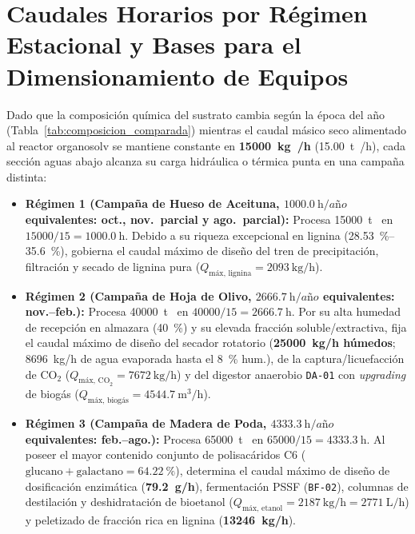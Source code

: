 \documentclass{report}
\begin{document}
\section{Caudales Horarios por Régimen Estacional y Bases para el Dimensionamiento de Equipos}
Dado que la composición química del sustrato cambia según la época del año (Tabla~\ref{tab:composicion_comparada}) mientras el caudal másico seco alimentado al reactor organosolv se mantiene constante en \textbf{\SI{15000}{\kilo\gram{}/\hour}} (\SI{15.00}{\tonne{}/\hour}), cada sección aguas abajo alcanza su carga hidráulica o térmica punta en una campaña distinta:
\begin{itemize}
    \item \textbf{Régimen 1 (Campaña de Hueso de Aceituna, $\SI{1000.0}{\hour/a\text{\~{n}}o}$ equivalentes: oct., nov.\ parcial y ago.\ parcial):} Procesa \SI{15000}{\tonne{}} en $\num{15000} / 15 = \SI{1000.0}{\hour}$. Debido a su riqueza excepcional en lignina (\SI{28.53}{\percent}--\SI{35.6}{\percent}), gobierna el caudal máximo de diseño del tren de precipitación, filtración y secado de lignina pura (\textbf{$Q_{\text{máx, lignina}} = \SI{2093}{\kilo\gram/\hour}$}).
    \item \textbf{Régimen 2 (Campaña de Hoja de Olivo, $\SI{2666.7}{\hour/a\text{\~{n}}o}$ equivalentes: nov.--feb.):} Procesa \SI{40000}{\tonne{}} en $\num{40000} / 15 = \SI{2666.7}{\hour}$. Por su alta humedad de recepción en almazara (\SI{40}{\percent}) y su elevada fracción soluble/extractiva, fija el caudal máximo de diseño del secador rotatorio (\textbf{\SI{25000}{\kilo\gram/\hour} húmedos}; \SI{8696}{\kilo\gram/\hour} de agua evaporada hasta el \SI{8}{\percent} hum.), de la captura/licuefacción de $\text{CO}_2$ (\textbf{$Q_{\text{máx, CO}_2} = \SI{7672}{\kilo\gram/\hour}$}) y del digestor anaerobio \texttt{DA-01} con \textit{upgrading} de biogás (\textbf{$Q_{\text{máx, biogás}} = \SI{4544.7}{\cubic\meter/\hour}$}).
    \item \textbf{Régimen 3 (Campaña de Madera de Poda, $\SI{4333.3}{\hour/a\text{\~{n}}o}$ equivalentes: feb.--ago.):} Procesa \SI{65000}{\tonne{}} en $\num{65000} / 15 = \SI{4333.3}{\hour}$. Al poseer el mayor contenido conjunto de polisacáridos C6 ($\text{glucano} + \text{galactano} = \SI{64.22}{\percent}$), determina el caudal máximo de diseño de dosificación enzimática (\textbf{\SI{79.2}{\gram/\hour}}), fermentación PSSF (\texttt{BF-02}), columnas de destilación y deshidratación de bioetanol (\textbf{$Q_{\text{máx, etanol}} = \SI{2187}{\kilo\gram/\hour} = \SI{2771}{\liter/\hour}$}) y peletizado de fracción rica en lignina (\textbf{\SI{13246}{\kilo\gram/\hour}}).
\end{itemize}
\end{document}
